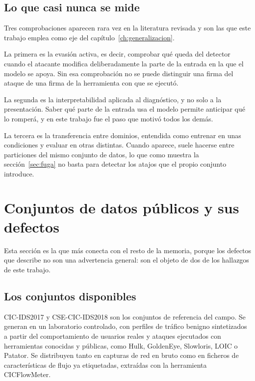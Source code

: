 \subsection*{Lo que casi nunca se mide}

Tres comprobaciones aparecen rara vez en la literatura revisada y son las que
este trabajo emplea como eje del capítulo~\ref{ch:generalizacion}.

La primera es la evasión activa, es decir, comprobar qué queda del detector
cuando el atacante modifica deliberadamente la parte de la entrada en la que el
modelo se apoya. Sin esa comprobación no se puede distinguir una firma del ataque
de una firma de la herramienta con que se ejecutó.

La segunda es la interpretabilidad aplicada al diagnóstico, y no solo a la
presentación. Saber qué parte de la entrada usa el modelo permite anticipar qué
lo romperá, y en este trabajo fue el paso que motivó todos los demás.

La tercera es la transferencia entre dominios, entendida como entrenar en unas
condiciones y evaluar en otras distintas. Cuando aparece, suele hacerse entre
particiones del mismo conjunto de datos, lo que como muestra la
sección~\ref{sec:fuga} no basta para detectar los atajos que el propio conjunto
introduce.

\section{Conjuntos de datos públicos y sus defectos}
\label{sec:sota-datasets}

Esta sección es la que más conecta con el resto de la memoria, porque los
defectos que describe no son una advertencia general: son el objeto de dos de los
hallazgos de este trabajo.

\subsection*{Los conjuntos disponibles}

CIC-IDS2017 y CSE-CIC-IDS2018 \cite{Sharafaldin2018, CSECICIDS2018} son los
conjuntos de referencia del campo. Se generan en un laboratorio controlado, con
perfiles de tráfico benigno sintetizados a partir del comportamiento de usuarios
reales y ataques ejecutados con herramientas conocidas y públicas, como Hulk,
GoldenEye, Slowloris, LOIC o Patator. Se distribuyen tanto en capturas de red en
bruto como en ficheros de características de flujo ya etiquetadas, extraídas con
la herramienta CICFlowMeter.

